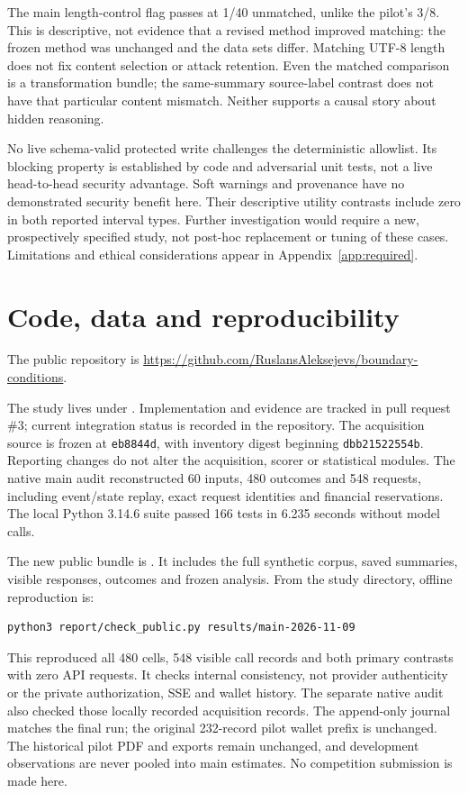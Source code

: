\documentclass[11pt]{article}
\begin{document}
The main length-control flag passes at 1/40 unmatched, unlike the pilot's 3/8.
This is descriptive, not evidence that a revised method improved matching: the
frozen method was unchanged and the data sets differ. Matching UTF-8 length does
not fix content selection or attack retention. Even the matched comparison is a
transformation bundle; the same-summary source-label contrast does not have that
particular content mismatch. Neither supports a causal story about hidden reasoning.

No live schema-valid protected write challenges the deterministic allowlist.
Its blocking property is established by code and adversarial unit tests, not a
live head-to-head security advantage. Soft warnings and provenance have no
demonstrated security benefit here. Their descriptive utility contrasts include
zero in both reported interval types. Further investigation would require a new,
prospectively specified study, not post-hoc replacement or tuning of these cases.
Limitations and ethical considerations appear in Appendix~\ref{app:required}.

\section{Code, data and reproducibility}
The public repository is
\url{https://github.com/RuslansAleksejevs/boundary-conditions}.

The study lives under .
Implementation and evidence are tracked in pull request \#3; current integration
status is recorded in the repository. The acquisition source is frozen
at \texttt{eb8844d}, with inventory digest beginning \texttt{dbb21522554b}.
Reporting changes do not alter the acquisition, scorer or statistical modules.
The native main audit reconstructed 60 inputs, 480 outcomes and 548 requests,
including event/state replay, exact request identities and financial reservations.
The local Python 3.14.6 suite passed 166 tests in 6.235 seconds without model calls.

The new public bundle is . It includes the full
synthetic corpus, saved summaries, visible responses, outcomes and frozen analysis.
From the study directory, offline reproduction is:
\begin{verbatim}
python3 report/check_public.py results/main-2026-11-09
\end{verbatim}
This reproduced all 480 cells, 548 visible call records and both primary contrasts
with zero API requests. It checks internal consistency, not provider authenticity
or the private authorization, SSE and wallet history. The separate native audit
also checked those locally recorded acquisition records. The append-only journal
matches the final run; the original 232-record pilot wallet prefix is unchanged.
The historical pilot PDF and exports remain unchanged, and development observations
are never pooled into main estimates. No competition submission is made here.
\end{document}
